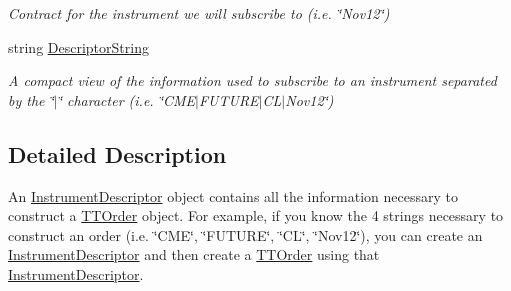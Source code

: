 \begin{DoxyCompactItemize}
\begin{DoxyCompactList}\small\item\em Contract for the instrument we will subscribe to (i.\-e. \char`\"{}\-Nov12\char`\"{}) \end{DoxyCompactList}\item 
string \hyperlink{class_e_z_a_p_i_1_1_containers_1_1_instrument_descriptor_af3263bdcd2fba81dbdea077e68dd920e}{Descriptor\-String}
\begin{DoxyCompactList}\small\item\em A compact view of the information used to subscribe to an instrument separated by the \char`\"{}$|$\char`\"{} character (i.\-e. \char`\"{}\-C\-M\-E$|$\-F\-U\-T\-U\-R\-E$|$\-C\-L$|$\-Nov12\char`\"{}) \end{DoxyCompactList}\end{DoxyCompactItemize}


\subsection{Detailed Description}
An \hyperlink{class_e_z_a_p_i_1_1_containers_1_1_instrument_descriptor}{Instrument\-Descriptor} object contains all the information necessary to construct a \hyperlink{class_e_z_a_p_i_1_1_containers_1_1_t_t_order}{T\-T\-Order} object. For example, if you know the 4 strings necessary to construct an order (i.\-e. \char`\"{}\-C\-M\-E\char`\"{}, \char`\"{}\-F\-U\-T\-U\-R\-E\char`\"{}, \char`\"{}\-C\-L\char`\"{}, \char`\"{}\-Nov12\char`\"{}), you can create an \hyperlink{class_e_z_a_p_i_1_1_containers_1_1_instrument_descriptor}{Instrument\-Descriptor} and then create a \hyperlink{class_e_z_a_p_i_1_1_containers_1_1_t_t_order}{T\-T\-Order} using that \hyperlink{class_e_z_a_p_i_1_1_containers_1_1_instrument_descriptor}{Instrument\-Descriptor}. 



